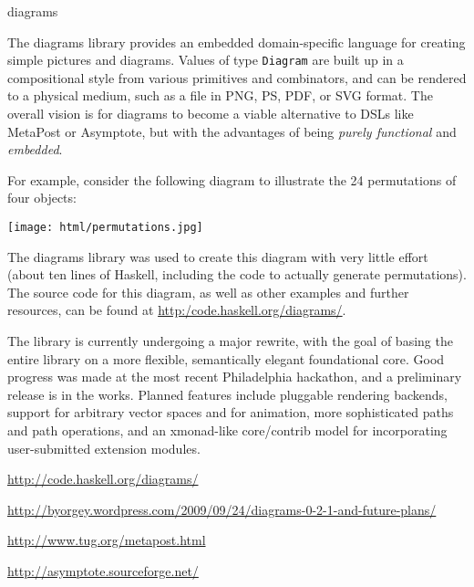 \begin{hcarentry}[updated]{diagrams}
\makeheader

The diagrams library provides an embedded domain-specific language for
creating simple pictures and diagrams. Values of type \texttt{Diagram}
are built up in a compositional style from various primitives and
combinators, and can be rendered to a physical medium, such as a file
in PNG, PS, PDF, or SVG format.  The overall vision is for diagrams to
become a viable alternative to DSLs like MetaPost or Asymptote, but with
the advantages of being \emph{purely functional} and
\emph{embedded}.

For example, consider the following diagram to illustrate the 24
permutations of four objects:

\begin{center}
\texttt{[image: html/permutations.jpg]}
\end{center}

The diagrams library was used to create this diagram with very
little effort (about ten lines of Haskell, including the code to actually
generate permutations).  The source code for this diagram, as well as
other examples and further resources, can be found at
\url{http:/code.haskell.org/diagrams/}.

The library is currently undergoing a major rewrite, with the goal of
basing the entire library on a more flexible, semantically elegant
foundational core.  Good progress was made at the most recent
Philadelphia hackathon, and a preliminary release is in the works.
Planned features include pluggable rendering backends, support for
arbitrary vector spaces and for animation, more sophisticated paths
and path operations, and an xmonad-like core/contrib model for
incorporating user-submitted extension modules.

\FurtherReading
\begin{compactitem}
\item  \url{http://code.haskell.org/diagrams/} 
\item  \url{http://byorgey.wordpress.com/2009/09/24/diagrams-0-2-1-and-future-plans/} 
\item  \url{http://www.tug.org/metapost.html} 
\item  \url{http://asymptote.sourceforge.net/}
\end{compactitem}
\end{hcarentry}
